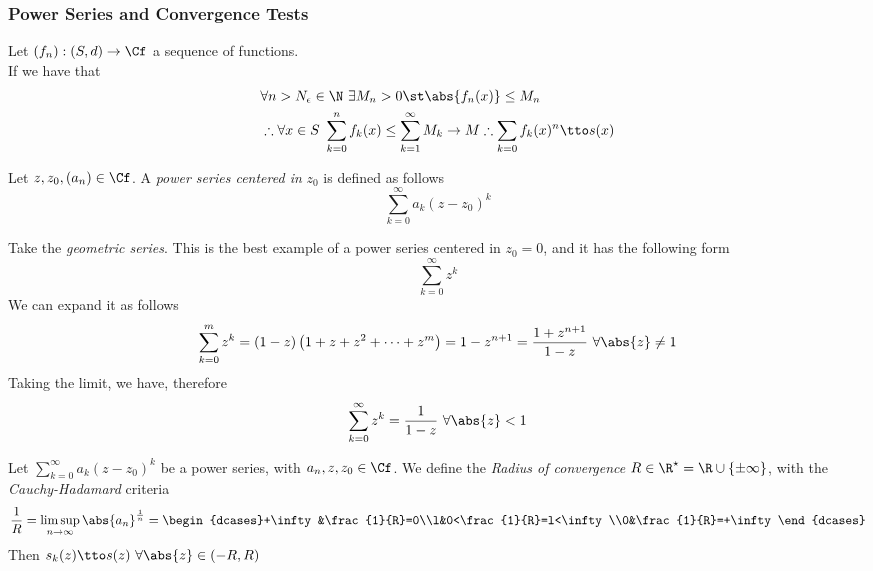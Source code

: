 \documentclass[../mmf.tex]{subfiles}
\begin{document}
\subsubsection{Power Series and Convergence Tests}
\begin{thm}
	Let $(f_n):(S,d)\to\Cf$ a sequence of functions.\\
	If we have that
	\begin{equation*}
		\begin{aligned}
			&\forall n>N_\epsilon\in\N\ \exists M_n>0\st\abs{f_n(x)}\le M_n\\
			&\therefore\forall x\in S\ \sum_{k=0}^nf_k(x)\le\sum_{k=1}^{\infty}M_k\to M\therefore\sum_{k=0}f_k(x)^n\tto s(x)
		\end{aligned}
	\end{equation*}
\end{thm}
\begin{dfn}
	Let $z,z_0,(a_n)\in\Cf$. A \textit{power series centered in} $z_0$ is defined as follows
	\begin{equation}
		\sum_{k=0}^\infty a_k(z-z_0)^k
		\label{eq:powerseries}
	\end{equation}
\end{dfn}
\begin{eg}
	Take the \textit{geometric series}. This is the best example of a power series centered in $z_0=0$, and it has the following form
	\begin{equation}
		\sum_{k=0}^\infty z^k
		\label{eq:geometricpw}
	\end{equation}
	We can expand it as follows
	\begin{equation}
		\sum_{k=0}^{m}z^k=(1-z)\left( 1+z+z^2+\cdots+z^m \right)=1-z^{n+1}=\frac{1+z^{n+1}}{1-z}\ \forall\abs{z}\ne1
		\label{eq:geometricseries}
	\end{equation}
	Taking the limit, we have, therefore
	\begin{equation}
		\sum_{k=0}^{\infty}z^k=\frac{1}{1-z}\ \forall\abs{z}<1
		\label{eq:geometricseriessum}
	\end{equation}
\end{eg}
\begin{thm}
	Let $\sum_{k=0}^{\infty}a_k(z-z_0)^k$ be a power series, with $a_n,z,z_0\in\Cf$. We define the \textit{Radius of convergence} $R\in\R^{\star}=\R\cup\{\pm\infty\}$, with the \textit{Cauchy-Hadamard} criteria
	\begin{equation}
		\frac{1}{R}=\limsup_{n\to\infty}\abs{a_n}^{\frac{1}{n}}=\begin{dcases}+\infty&\frac{1}{R}=0\\l&0<\frac{1}{R}=l<\infty\\0&\frac{1}{R}=+\infty\end{dcases}
		\label{eq:cauchyhadamard}
	\end{equation}
	Then $s_k(z)\tto s(z)\ \forall\abs{z}\in(-R,R)$
\end{thm}
\end{document}
